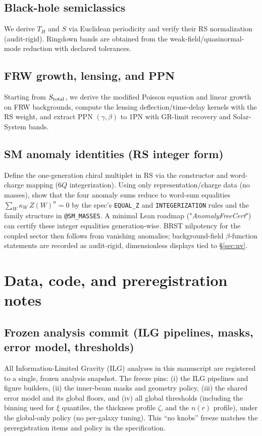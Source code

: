 \documentclass[11pt]{article}
\begin{document}
\subsection*{Black-hole semiclassics}
We derive $T_H$ and $S$ via Euclidean periodicity and verify their RS normalization (audit-rigid). Ringdown bands are obtained from the weak-field/quasinormal-mode reduction with declared tolerances.

\subsection*{FRW growth, lensing, and PPN}
Starting from $S_{\rm total}$, we derive the modified Poisson equation and linear growth on FRW backgrounds, compute the lensing deflection/time-delay kernels with the RS weight, and extract PPN $(\gamma,\beta)$ to 1PN with GR-limit recovery and Solar-System bands.

\subsection*{SM anomaly identities (RS integer form)}
Define the one-generation chiral multiplet in RS via the constructor and word-charge mapping (6$Q$ integerization). Using only representation/charge data (no masses), show that the four anomaly sums reduce to word-sum equalities $\sum_W \kappa_W\,Z(W)^n=0$ by the spec's \texttt{EQUAL\_Z} and \texttt{INTEGERIZATION} rules and the family structure in \texttt{@SM\_MASSES}. A minimal Lean roadmap ("\emph{AnomalyFreeCert}") can certify these integer equalities generation-wise. BRST nilpotency for the coupled sector then follows from vanishing anomalies; background-field $\beta$-function statements are recorded as audit-rigid, dimensionless displays tied to \S\ref{sec:uv}.


\section{Data, code, and preregistration notes}

\subsection*{Frozen analysis commit (ILG pipelines, masks, error model, thresholds)}
All Information-Limited Gravity (ILG) analyses in this manuscript are registered to a single, frozen analysis snapshot. The freeze pins: (i) the ILG pipelines and figure builders, (ii) the inner-beam masks and geometry policy, (iii) the shared error model and its global floors, and (iv) all global thresholds (including the binning used for $\xi$ quantiles, the thickness profile $\zeta$, and the $n(r)$ profile), under the global-only policy (no per-galaxy tuning). This ``no knobs'' freeze matches the preregistration items and policy in the specification.   
\end{document}

